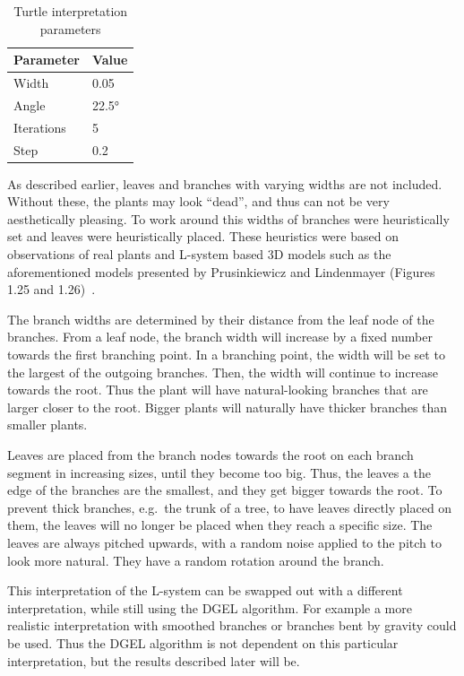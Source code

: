 \begin{table}
    \centering
    \begin{tabular}{| l | l |}
    \hline
    \textbf{Parameter} & \textbf{Value} \\ \hline
    Width & 0.05 \\ \hline
    Angle & 22.5° \\ \hline
    Iterations & 5 \\ \hline
    Step & 0.2 \\
    \hline
    \end{tabular}
    \caption[]{Turtle interpretation parameters}
    \label{tab:turtle-param}
\end{table}

As described earlier, leaves and branches with varying widths are not included.
Without these, the plants may look ``dead'', and thus can not be very aesthetically pleasing.
To work around this widths of branches were heuristically set and leaves were heuristically placed.
These heuristics were based on observations of real plants and L-system based 3D models such as the aforementioned models presented by Prusinkiewicz and Lindenmayer (Figures 1.25 and 1.26)~\cite{2012Prusinkiewicz}.

The branch widths are determined by their distance from the leaf node of the branches.
From a leaf node, the branch width will increase by a fixed number towards the first branching point.
In a branching point, the width will be set to the largest of the outgoing branches.
Then, the width will continue to increase towards the root.
Thus the plant will have natural-looking branches that are larger closer to the root.
Bigger plants will naturally have thicker branches than smaller plants.

Leaves are placed from the branch nodes towards the root on each branch segment in increasing sizes, until they become too big.
Thus, the leaves a the edge of the branches are the smallest, and they get bigger towards the root.
To prevent thick branches, e.g.\ the trunk of a tree, to have leaves directly placed on them, the leaves will no longer be placed when they reach a specific size.
The leaves are always pitched upwards, with a random noise applied to the pitch to look more natural.
They have a random rotation around the branch.

This interpretation of the L-system can be swapped out with a different interpretation, while still using the DGEL algorithm.
For example a more realistic interpretation with smoothed branches or branches bent by gravity could be used.
Thus the DGEL algorithm is not dependent on this particular interpretation, but the results described later will be.

